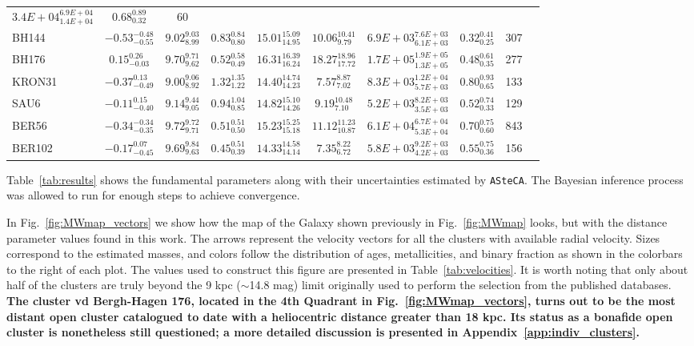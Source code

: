 \documentclass[referee]{aa}
\begin{document}
\begin{table}
\begin{tabular}{lccccccccc}
    $3.4E+04_{1.4E+04}^{6.9E+04}$ & $0.68_{0.32}^{0.89}$ & 60 \\[.2cm]
    BH144 & $-0.53_{-0.55}^{-0.48}$ & $9.02_{8.99}^{9.03}$ &
    $0.83_{0.80}^{0.84}$ & $15.01_{14.95}^{15.09}$ & $10.06_{9.79}^{10.41}$ &
    $6.9E+03_{6.1E+03}^{7.6E+03}$ & $0.32_{0.25}^{0.41}$ & 307 \\[.2cm]
    BH176 & $0.15_{-0.03}^{0.26}$ & $9.70_{9.62}^{9.71}$ &
    $0.52_{0.49}^{0.58}$ & $16.31_{16.24}^{16.39}$ & $18.27_{17.72}^{18.96}$ &
    $1.7E+05_{1.3E+05}^{1.9E+05}$ & $0.48_{0.35}^{0.61}$ & 277 \\[.2cm]
    KRON31 & $-0.37_{-0.49}^{0.13}$ & $9.00_{8.92}^{9.06}$ &
    $1.32_{1.22}^{1.35}$ & $14.40_{14.23}^{14.74}$ & $7.57_{7.02}^{8.87}$ &
    $8.3E+03_{5.7E+03}^{1.2E+04}$ & $0.80_{0.65}^{0.93}$ & 133 \\[.2cm]
    SAU6 & $-0.11_{-0.40}^{0.15}$ & $9.14_{9.05}^{9.44}$ &
    $0.94_{0.85}^{1.04}$ & $14.82_{14.26}^{15.10}$ & $9.19_{7.10}^{10.48}$ &
    $5.2E+03_{3.5E+03}^{8.2E+03}$ & $0.52_{0.33}^{0.74}$ & 129 \\[.2cm]
    BER56 & $-0.34_{-0.35}^{-0.34}$ & $9.72_{9.71}^{9.72}$ &
    $0.51_{0.50}^{0.51}$ & $15.23_{15.18}^{15.25}$ & $11.12_{10.87}^{11.23}$ &
    $6.1E+04_{5.3E+04}^{6.7E+04}$ & $0.70_{0.60}^{0.75}$ & 843 \\[.2cm]
    BER102 & $-0.17_{-0.45}^{0.07}$ & $9.69_{9.63}^{9.84}$ &
    $0.45_{0.39}^{0.51}$ & $14.33_{14.14}^{14.58}$ & $7.35_{6.72}^{8.22}$ &
    $5.8E+03_{4.2E+03}^{9.2E+03}$ & $0.55_{0.36}^{0.75}$ & 156 \\[.2cm]
  \hline
  \end{tabular}
  \end{table}


  Table~\ref{tab:results} shows the fundamental parameters along with their
  uncertainties estimated by \texttt{ASteCA}. The Bayesian inference process
  was allowed to run for enough steps to achieve convergence.

  In Fig.~\ref{fig:MWmap_vectors} we show how the map of the Galaxy shown
  previously in Fig.~\ref{fig:MWmap} looks, but with the distance parameter
  values found in this work. The arrows represent the velocity vectors for all
  the clusters with available radial velocity. Sizes correspond to the estimated
  masses, and colors follow the distribution of ages, metallicities, and binary
  fraction as shown in the colorbars to the right of each plot. The values used
  to construct this figure are presented in Table~\ref{tab:velocities}.
  It is worth noting that only about half of the clusters are truly beyond the 9
  kpc ($\sim$14.8 mag) limit originally used to perform the selection from the
  published databases.
  \textbf{The cluster vd Bergh-Hagen 176, located in the 4th Quadrant
  in Fig.~\ref{fig:MWmap_vectors}, turns out to be the most distant open cluster
  catalogued to date with a heliocentric distance greater than 18 kpc. Its
  status as a bonafide open cluster is nonetheless still questioned; a more
  detailed discussion is presented in Appendix~\ref{app:indiv_clusters}.}
\end{document}
